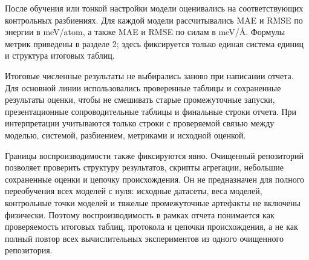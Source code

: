 После обучения или тонкой настройки модели оценивались на соответствующих контрольных разбиениях. Для каждой модели рассчитывались MAE и RMSE по энергии в meV/atom, а также MAE и RMSE по силам в meV/Å. Формулы метрик приведены в разделе 2; здесь фиксируется только единая система единиц и структура итоговых таблиц.

Итоговые численные результаты не выбирались заново при написании отчета. Для основной линии использовались проверенные таблицы и сохраненные результаты оценки, чтобы не смешивать старые промежуточные запуски, презентационные сопроводительные таблицы и финальные строки отчета. При интерпретации учитываются только строки с проверяемой связью между моделью, системой, разбиением, метриками и исходной оценкой.

Границы воспроизводимости также фиксируются явно. Очищенный репозиторий позволяет проверить структуру результатов, скрипты агрегации, небольшие сохраненные оценки и цепочку происхождения. Он не предназначен для полного переобучения всех моделей с нуля: исходные датасеты, веса моделей, контрольные точки моделей и тяжелые промежуточные артефакты не включены физически. Поэтому воспроизводимость в рамках отчета понимается как проверяемость итоговых таблиц, протокола и цепочки происхождения, а не как полный повтор всех вычислительных экспериментов из одного очищенного репозитория.
